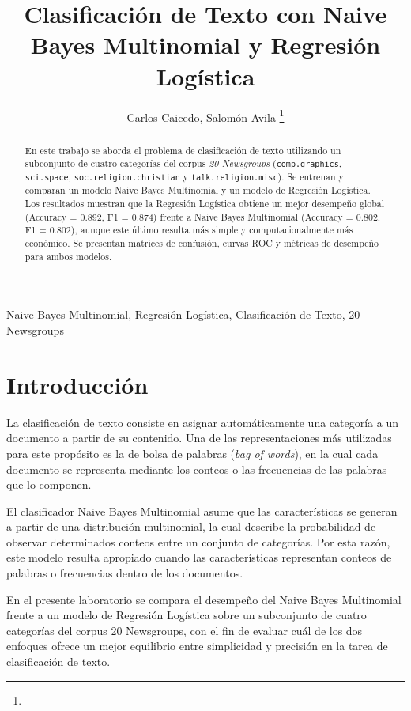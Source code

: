 \documentclass[journal]{IEEEtran}
\begin{document}
\title{Clasificación de Texto con Naive Bayes Multinomial y Regresión Logística}

\author{Carlos Caicedo, Salomón Avila
\thanks{}}


\maketitle

\begin{abstract}
En este trabajo se aborda el problema de clasificación de texto utilizando un subconjunto de cuatro categorías del corpus \emph{20 Newsgroups} (\texttt{comp.graphics}, \texttt{sci.space}, \texttt{soc.religion.christian} y \texttt{talk.religion.misc}). Se entrenan y comparan un modelo Naive Bayes Multinomial y un modelo de Regresión Logística. Los resultados muestran que la Regresión Logística obtiene un mejor desempeño global (Accuracy = 0.892, F1 = 0.874) frente a Naive Bayes Multinomial (Accuracy = 0.802, F1 = 0.802), aunque este último resulta más simple y computacionalmente más económico. Se presentan matrices de confusión, curvas ROC y métricas de desempeño para ambos modelos.
\end{abstract}

\begin{IEEEkeywords}
Naive Bayes Multinomial, Regresión Logística, Clasificación de Texto, 20 Newsgroups
\end{IEEEkeywords}

\section{Introducción}
La clasificación de texto consiste en asignar automáticamente una categoría a un documento a partir de su contenido. Una de las representaciones más utilizadas para este propósito es la de bolsa de palabras (\emph{bag of words}), en la cual cada documento se representa mediante los conteos o las frecuencias de las palabras que lo componen.

El clasificador Naive Bayes Multinomial asume que las características se generan a partir de una distribución multinomial, la cual describe la probabilidad de observar determinados conteos entre un conjunto de categorías. Por esta razón, este modelo resulta apropiado cuando las características representan conteos de palabras o frecuencias dentro de los documentos.

En el presente laboratorio se compara el desempeño del Naive Bayes Multinomial frente a un modelo de Regresión Logística sobre un subconjunto de cuatro categorías del corpus 20 Newsgroups, con el fin de evaluar cuál de los dos enfoques ofrece un mejor equilibrio entre simplicidad y precisión en la tarea de clasificación de texto.
\end{document}
